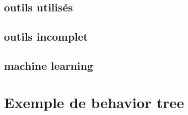 \documentclass[titlepage]{article}
\begin{document}
		\subsection{outils utilisés}
		\subsection{outils incomplet}
		\subsection{machine learning}
	
	\clearpage
	\section{Exemple de behavior tree}
	
	\clearpage
	
	
	
\end{document}
